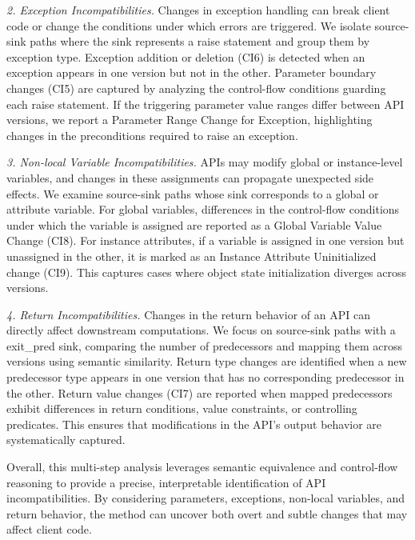\textit{2. Exception Incompatibilities.} Changes in exception handling can break client code or change the conditions under which errors are triggered. We isolate source-sink paths where the sink represents a raise statement and group them by exception type. Exception addition or deletion (CI6) is detected when an exception appears in one version but not in the other. Parameter boundary changes (CI5) are captured by analyzing the control-flow conditions guarding each raise statement. If the triggering parameter value ranges differ between API versions, we report a Parameter Range Change for Exception, highlighting changes in the preconditions required to raise an exception.

\textit{3. Non-local Variable Incompatibilities.} APIs may modify global or instance-level variables, and changes in these assignments can propagate unexpected side effects. We examine source-sink paths whose sink corresponds to a global or attribute variable. For global variables, differences in the control-flow conditions under which the variable is assigned are reported as a Global Variable Value Change (CI8). For instance attributes, if a variable is assigned in one version but unassigned in the other, it is marked as an Instance Attribute Uninitialized change (CI9). This captures cases where object state initialization diverges across versions.

\textit{4. Return Incompatibilities.} Changes in the return behavior of an API can directly affect downstream computations. We focus on source-sink paths with a exit\_pred sink, comparing the number of predecessors and mapping them across versions using semantic similarity. Return type changes are identified when a new predecessor type appears in one version that has no corresponding predecessor in the other. Return value changes (CI7) are reported when mapped predecessors exhibit differences in return conditions, value constraints, or controlling predicates. This ensures that modifications in the API's output behavior are systematically captured.

Overall, this multi-step analysis leverages semantic equivalence and control-flow reasoning to provide a precise, interpretable identification of API incompatibilities. By considering parameters, exceptions, non-local variables, and return behavior, the method can uncover both overt and subtle changes that may affect client code.



